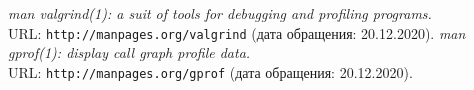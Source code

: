\begin{thebibliography}{99}
{\itshape man valgrind(1): a suit of tools for debugging and profiling programs.} \\URL: \texttt{http://manpages.org/valgrind} (дата обращения: 20.12.2020).
{\itshape man gprof(1): display call graph profile data.} \\URL: \texttt{http://manpages.org/gprof} (дата обращения: 20.12.2020).
\end{thebibliography}
\pagebreak


